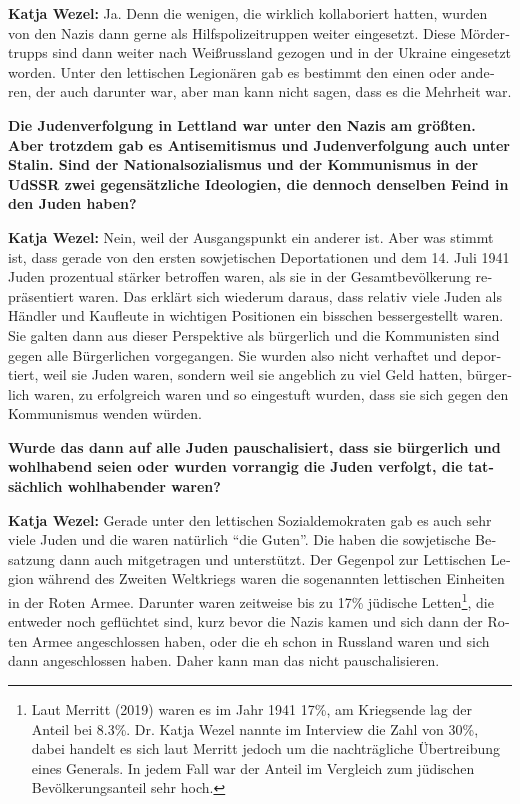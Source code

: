 \begin{otherlanguage}{ngerman}
\textbf{Katja Wezel:} Ja. Denn die wenigen, die wirklich kollaboriert hatten, wurden von den Nazis dann gerne als Hilfspolizeitruppen weiter eingesetzt. Diese Mördertrupps sind dann weiter nach Weißrussland gezogen und in der Ukraine eingesetzt worden. Unter den lettischen Legionären gab es bestimmt den einen oder anderen, der auch darunter war, aber man kann nicht sagen, dass es die Mehrheit war.

\textbf{Die Judenverfolgung in Lettland war unter den Nazis am größten. Aber trotzdem gab es Antisemitismus und Judenverfolgung auch unter Stalin. Sind der Nationalsozialismus und der Kommunismus in der UdSSR zwei gegensätzliche Ideologien, die dennoch denselben Feind in den Juden haben?}

\textbf{Katja Wezel:} Nein, weil der Ausgangspunkt ein anderer ist. Aber was stimmt ist, dass gerade von den ersten sowjetischen Deportationen und dem 14. Juli 1941 Juden prozentual stärker betroffen waren, als sie in der Gesamtbevölkerung repräsentiert waren. Das erklärt sich wiederum daraus, dass relativ viele Juden als Händler und Kaufleute in wichtigen Positionen ein bisschen bessergestellt waren. Sie galten dann aus dieser Perspektive als bürgerlich und die Kommunisten sind gegen alle Bürgerlichen vorgegangen. Sie wurden also nicht verhaftet und deportiert, weil sie Juden waren, sondern weil sie angeblich zu viel Geld hatten, bürgerlich waren, zu erfolgreich waren und so eingestuft wurden, dass sie sich gegen den Kommunismus wenden würden. 

\textbf{Wurde das dann auf alle Juden pauschalisiert, dass sie bürgerlich und wohlhabend seien oder wurden vorrangig die Juden verfolgt, die tatsächlich wohlhabender waren?} 

\textbf{Katja Wezel:} Gerade unter den lettischen Sozialdemokraten gab es auch sehr viele Juden und die waren natürlich ``die Guten''. Die haben die sowjetische Besatzung dann auch mitgetragen und unterstützt. Der Gegenpol zur Lettischen Legion während des Zweiten Weltkriegs waren die sogenannten lettischen Einheiten in der Roten Armee. Darunter waren zeitweise bis zu 17\% jüdische Letten\footnote{Laut Merritt (2019) waren es im Jahr 1941 17\%, am Kriegsende lag der Anteil bei 8.3\%. Dr. Katja Wezel nannte im Interview die Zahl von 30\%, dabei handelt es sich laut Merritt jedoch um die nachträgliche Übertreibung eines Generals. In jedem Fall war der Anteil im Vergleich zum jüdischen Bevölkerungsanteil sehr hoch.}, die entweder noch geflüchtet sind, kurz bevor die Nazis kamen und sich dann der Roten Armee angeschlossen haben, oder die eh schon in Russland waren und sich dann angeschlossen haben. Daher kann man das nicht pauschalisieren. 


\end{otherlanguage}
